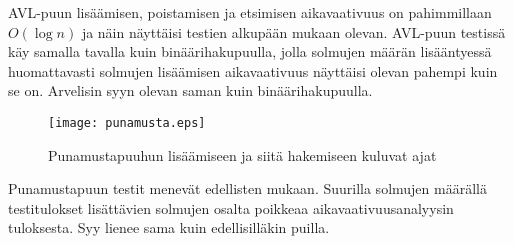 \documentclass[12pt,a4paper,leqno,titlepage]{article}
\begin{document}
AVL-puun lisäämisen, poistamisen ja etsimisen aikavaativuus on pahimmillaan $O(\log n)$
ja näin näyttäisi testien alkupään mukaan olevan. AVL-puun testissä käy samalla
tavalla kuin binäärihakupuulla, jolla solmujen määrän lisääntyessä huomattavasti
solmujen lisäämisen aikavaativuus näyttäisi olevan pahempi kuin se on. Arvelisin 
syyn olevan saman kuin binäärihakupuulla.

\begin{figure}[!h]
  \centering
  \texttt{[image: punamusta.eps]}\\
  \caption{Punamustapuuhun lisäämiseen ja siitä hakemiseen kuluvat ajat}
\end{figure}

Punamustapuun testit menevät edellisten mukaan. Suurilla solmujen määrällä
testitulokset lisättävien solmujen osalta poikkeaa aikavaativuusanalyysin tuloksesta.
Syy lienee sama kuin edellisilläkin puilla.
\end{document}

